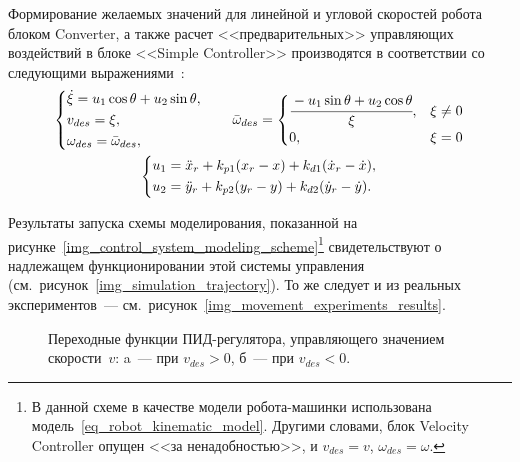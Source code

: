 Формирование желаемых значений для линейной и угловой скоростей робота блоком Converter, а также расчет <<предварительных>> управляющих воздействий в блоке <<Simple Controller>> производятся в соответствии со следующими выражениями~\cite{de_luca}:
\begin{gather}
    \left\{
    \begin{aligned}
        & \dot{\xi} = u_1 \cos \theta + u_2 \sin \theta, \\
        & v_{des} = \xi, \\
        & \omega_{des} = \bar\omega_{des},
    \end{aligned}
    \right.
    \qquad
    \bar\omega_{des} =
    \begin{cases}
        \cfrac{-u_1 \sin \theta + u_2 \cos \theta}{\xi}, & \xi \ne 0 \\
        0, & \xi = 0
    \end{cases}
    \\
    \left\{
    \begin{aligned}
        & u_1 = \ddot{x}_r + k_{p1} (x_r - x) + k_{d1} (\dot{x}_r - \dot{x}), \\
        & u_2 = \ddot{y}_r + k_{p2} (y_r - y) + k_{d2} (\dot{y}_r - \dot{y})\ldotp
    \end{aligned}
    \right.
\end{gather}

Результаты запуска схемы моделирования, показанной на рисунке~\ref{img_control_system_modeling_scheme}\lefteqn{,}\footnote{В данной схеме в качестве модели робота-машинки использована модель~\eqref{eq_robot_kinematic_model}. Другими словами, блок Velocity Controller опущен <<за ненадобностью>>, и $v_{des} = v$,  $\omega_{des} = \omega$.} свидетельствуют о надлежащем функционировании этой системы управления (см.~рисунок~\ref{img_simulation_trajectory}).
То же следует и из реальных экспериментов~--- см.~рисунок~\ref{img_movement_experiments_results}.

\begin{figure}[h!]
    \caption{Переходные функции ПИД-регулятора, управляющего значением скорости~$v$: a~--- при $v_{des} > 0$, б~--- при $v_{des} < 0$.}
    \label{img_v_pid}
\end{figure}

